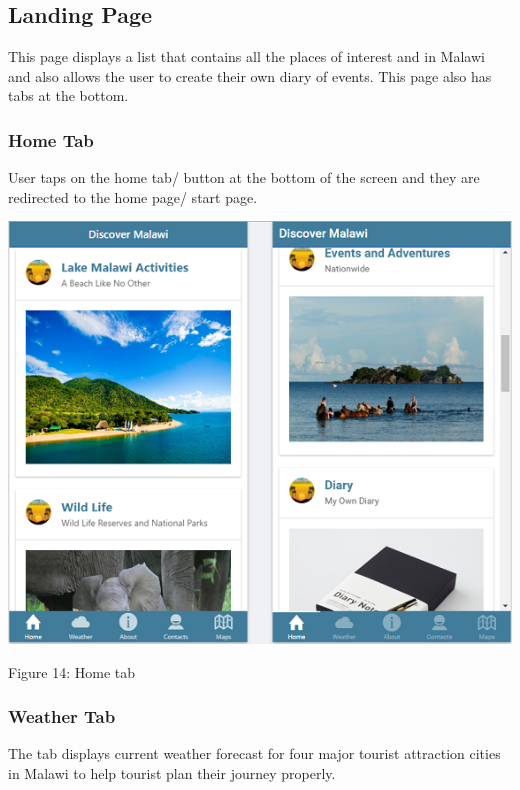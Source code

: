 \subsection{Landing Page}
This page displays a list that contains all the places of interest and in Malawi and also allows the user to create their own diary of events. This page also has tabs at the bottom.

\subsubsection{Home Tab}
User taps on the home tab/ button at the bottom of the screen and they are redirected to the home page/ start page.

\begin{center}    
	\includegraphics{img/startpage.png}
\end{center}
\begin{center}
	Figure 14: Home tab 
\end{center}
\paragraph{}

\subsubsection{Weather Tab}
The tab displays current weather forecast for four major tourist attraction cities in Malawi to help tourist plan their journey properly. 

